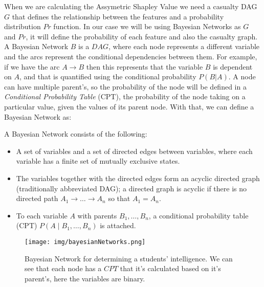 When we are calculating the Assymetric Shapley Value we need a casualty DAG $G$ that defines the relationship between the features and a probability distribution $Pr$ function. In our case we will be using Bayesian Networks as $G$ and $Pr$, it will define the probability of each feature and also the casualty graph. A Bayesian Network $B$ is a $DAG$, where each node represents a different variable and the arcs represent the conditional dependencies between them. For example, if we have the arc $A \longrightarrow B$ then this represents that the variable $B$ is dependent on $A$, and that is quantified using the conditional probability $P(B|A)$. A node can have multiple parent's, so the probability of the node will be defined in a \emph{Conditional Probability Table} (CPT), the probability of the node taking on a particular value, given the values of its parent node. With that, we can define a Bayesian Network as:

\begin{definition}
A Bayesian Network consists of the following:

\begin{itemize}
    \item A set of variables and a set of directed edges between variables, where each variable has a finite set of mutually exclusive states.
    \item The variables together with the directed edges form an acyclic directed graph (traditionally abbreviated DAG); a directed graph is acyclic if there is no directed path $A_1 \rightarrow \dots \rightarrow A_n$ so that $A_1 = A_n$.
    \item To each variable $A$ with parents $B_1, \dots, B_n$, a conditional probability table (CPT) $P(A \mid B_1, \dots, B_n)$ is attached.
\end{itemize}
    
\end{definition}

\begin{figure}[ht]
    \centering
    \texttt{[image: img/bayesianNetworks.png]}
    \caption{Bayesian Network for determining a students' intelligence. We can see that each node has a $CPT$ that it's calculated based on it's parent's, here the variables are binary.}
    \label{fig:bayesian_network_example}
\end{figure}

\newpage
 
